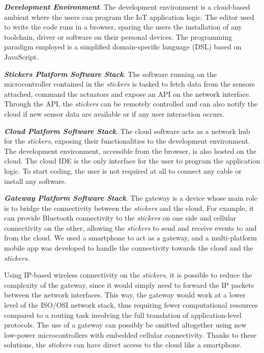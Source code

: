 \textbf{\textit{Development Environment}}. The development environment is a cloud-based ambient where the users can program the IoT application logic. The editor used to write the code runs in a browser, sparing the users the installation of any toolchain, driver or software on their personal devices. The programming paradigm employed is a simplified domain-specific language (DSL) based on JavaScript.

\textbf{\textit{Stickers Platform Software Stack}}. The software running on the microcontroller contained in the \textit{stickers} is tasked to fetch data from the sensors attached, command the actuators and expose an API on the network interface. Through the API, the \textit{stickers} can be remotely controlled and can also notify the cloud if new sensor data are available or if any user interaction occurs.

\textbf{\textit{Cloud Platform Software Stack}}. The cloud software acts as a network hub for the \textit{stickers}, exposing their functionalities to the development environment. The development environment, accessible from the browser, is also hosted on the cloud. The cloud IDE is the only interface for the user to program the application logic. To start coding, the user is not required at all to connect any cable or install any software.

\textbf{\textit{Gateway Platform Software Stack}}. The gateway is a device whose main role is to bridge the connectivity between the \textit{stickers} and the cloud. For example, it can provide Bluetooth connectivity to the \textit{stickers} on one side and cellular connectivity on the other, allowing the \textit{stickers} to send and receive events to and from the cloud. We used a smartphone to act as a gateway, and a multi-platform mobile app was developed to handle the connectivity towards the cloud and the \textit{stickers}.

Using IP-based wireless connectivity on the \textit{stickers}, it is possible to reduce the complexity of the gateway, since it would simply need to forward the IP packets between the network interfaces. This way, the gateway would work at a lower level of the ISO/OSI network stack, thus requiring fewer computational resources compared to a routing task involving the full translation of application-level protocols. The use of a gateway can possibly be omitted altogether using new low-power microcontrollers with embedded cellular connectivity. Thanks to these solutions, the \textit{stickers} can have direct access to the cloud like a smartphone.


